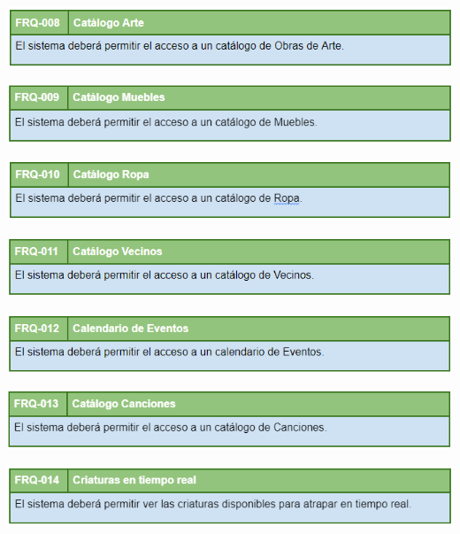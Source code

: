 	\bigskip
	
	\includegraphics[width=\textwidth]{img/cap5/FR/8.png}
	
	\bigskip
	
	\includegraphics[width=\textwidth]{img/cap5/FR/9.png}
	
	\bigskip
	
	\includegraphics[width=\textwidth]{img/cap5/FR/10.png}
	
	\bigskip
	
	\includegraphics[width=\textwidth]{img/cap5/FR/11.png}
	
	\bigskip
	
	\includegraphics[width=\textwidth]{img/cap5/FR/12.png}
	
	\bigskip
	
	\includegraphics[width=\textwidth]{img/cap5/FR/13.png}
	
	\bigskip
	
	\includegraphics[width=\textwidth]{img/cap5/FR/14.png}
	
